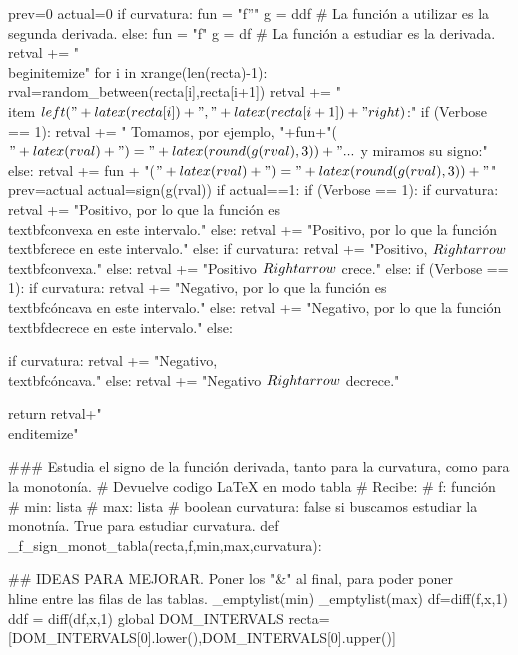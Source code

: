 \begin{sagesilent}
 prev=0
 actual=0
 if curvatura:
    fun = "f''"
    g = ddf # La función a utilizar es la segunda derivada.
 else:
    fun = "f"
    g = df # La función a estudiar es la derivada.
 retval += "\\begin{itemize}"
 for i in xrange(len(recta)-1):
  rval=random_between(recta[i],recta[i+1])
  retval += "\\item $\\left("+latex(recta[i])+","+latex(recta[i+1])+"\\right)$:"
  if (Verbose == 1):
   retval += " Tomamos, por ejemplo, "+fun+"($"+latex(rval)+") = "+latex(round(g(rval),3))+"...$  y miramos su signo:" 
  else:
   retval += fun + "($"+latex(rval)+") = "+latex(round(g(rval),3)) +"$"
  prev=actual
  actual=sign(g(rval))
  if actual==1: 
   if (Verbose == 1):
    if curvatura:
        retval += "Positivo, por lo que la función es \\textbf{convexa} en este intervalo."
    else:
        retval += "Positivo, por lo que la función \\textbf{crece} en este intervalo."  
   else:
    if curvatura:
        retval += "Positivo, $\\Rightarrow$ \\textbf{convexa}."
    else:  
        retval += "Positivo $\\Rightarrow$ crece."
  else:
   if (Verbose == 1):
    if curvatura:
        retval += "Negativo, por lo que la función es \\textbf{cóncava} en este intervalo."
    else:
        retval += "Negativo, por lo que la función \\textbf{decrece} en este intervalo."
   else:

    if curvatura:
        retval += "Negativo, \\textbf{cóncava}."
    else:
        retval += "Negativo $\\Rightarrow$ decrece."


 
 return retval+"\\end{itemize}"

### Estudia el signo de la función derivada, tanto para la curvatura, como para la monotonía.
# Devuelve codigo LaTeX en modo tabla
# Recibe:
# f: función
# min: lista
# max: lista
# boolean curvatura: false si buscamos estudiar la monotnía. True para estudiar curvatura.
def _f_sign_monot_tabla(recta,f,min,max,curvatura):

## IDEAS PARA MEJORAR. Poner los "&" al final, para poder poner \\hline entre las filas de las tablas.
 _emptylist(min)
 _emptylist(max)
 df=diff(f,x,1)
 ddf = diff(df,x,1)
 global DOM_INTERVALS
 recta= [DOM_INTERVALS[0].lower(),DOM_INTERVALS[0].upper()]
 

\end{sagesilent}
